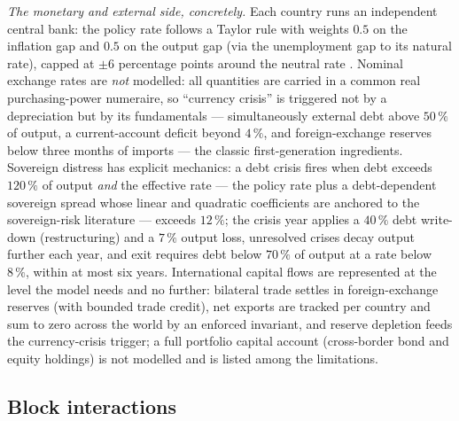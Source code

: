 \documentclass[a4paper,fleqn]{cas-sc}
\begin{document}
\emph{The monetary and external side, concretely.} Each country runs an independent central bank:
the policy rate follows a Taylor rule with weights $0.5$ on the inflation gap and $0.5$ on the
output gap (via the unemployment gap to its natural rate), capped at $\pm6$ percentage points
around the neutral rate \citep{taylor1993}. Nominal exchange rates are \emph{not} modelled: all
quantities are carried in a common real purchasing-power numeraire, so ``currency crisis'' is
triggered not by a depreciation but by its fundamentals --- simultaneously external debt above
$50\,\%$ of output, a current-account deficit beyond $4\,\%$, and foreign-exchange reserves
below three months of imports --- the classic first-generation ingredients. Sovereign distress has
explicit mechanics: a debt crisis fires when debt exceeds $120\,\%$ of output \emph{and} the
effective rate --- the policy rate plus a debt-dependent sovereign spread whose linear and
quadratic coefficients are anchored to the sovereign-risk literature
\citep{hilscher2010,arora2001} --- exceeds $12\,\%$; the crisis year applies a $40\,\%$ debt
write-down (restructuring) and a $7\,\%$ output loss, unresolved crises decay output further
each year, and exit requires debt below $70\,\%$ of output at a rate below $8\,\%$, within at
most six years. International capital flows are represented at the level the model needs and no
further: bilateral trade settles in foreign-exchange reserves (with bounded trade credit), net
exports are tracked per country and sum to zero across the world by an enforced invariant, and
reserve depletion feeds the currency-crisis trigger; a full portfolio capital account
(cross-border bond and equity holdings) is not modelled and is listed among the limitations.

\subsection{Block interactions}
\end{document}
